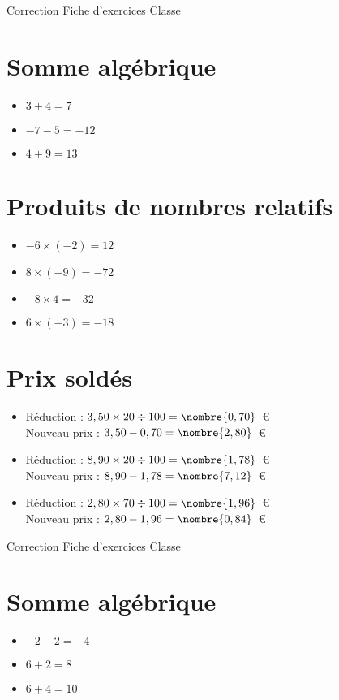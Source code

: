 \documentclass[a4paper,11pt,fleqn]{article}
\begin{document}
\pagestyle{empty}


{Correction} \hfill {\huge Fiche d'exercices } \hfill {Classe}

\section{Somme algébrique}
\begin{itemize}

  \item $3 +4=7$
  \item $-7 -5=-12$
  \item $4 +9=13$
\end{itemize}

\section{Produits de nombres relatifs}
\begin{itemize}

  \item $-6\times(-2)=12$
  \item $8\times(-9)=-72$
  \item $-8\times4=-32$
  \item $6\times(-3)=-18$
\end{itemize}

\section{Prix soldés}
\begin{itemize}

  \item Réduction : $3,50\times20\div100=\nombre{0,70}$~€\\
  Nouveau prix : $3,50-0,70=\nombre{2,80}$~€
  \item Réduction : $8,90\times20\div100=\nombre{1,78}$~€\\
  Nouveau prix : $8,90-1,78=\nombre{7,12}$~€
  \item Réduction : $2,80\times70\div100=\nombre{1,96}$~€\\
  Nouveau prix : $2,80-1,96=\nombre{0,84}$~€
\end{itemize}
\newpage
\setcounter{exo}{0}
\setcounter{section}{0}
{Correction} \hfill {\huge Fiche d'exercices } \hfill {Classe}

\section{Somme algébrique}
\begin{itemize}

  \item $-2 -2=-4$
  \item $6 +2=8$
  \item $6 +4=10$
\end{itemize}
\end{document}
